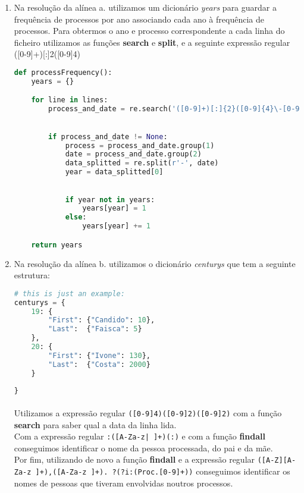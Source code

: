 \documentclass[11pt,a4paper]{report}
\begin{document}
    \begin{enumerate}[label=\alph*.]
        \item Na resolução da alínea a. utilizamos um dicionário \textit{years} para guardar a frequência de processos por ano associando cada ano à frequência de processos. Para obtermos o ano e processo correspondente a cada linha do ficheiro utilizamos as funções \textbf{search} e \textbf{split}, e a seguinte expressão regular ([0-9]+)[:]{2}([0-9]{4}) \\
        \begin{lstlisting}[language=Python, caption=Alínea a]
def processFrequency():
    years = {}

    for line in lines:
        process_and_date = re.search('([0-9]+)[:]{2}([0-9]{4}\-[0-9]{2}\-[0-9]{2})', line)
    

        if process_and_date != None:
            process = process_and_date.group(1)
            date = process_and_date.group(2)
            data_splitted = re.split(r'-', date)
            year = data_splitted[0]

        
            if year not in years:
                years[year] = 1
            else:
                years[year] += 1

    return years
        \end{lstlisting}

        \item Na resolução da alínea b. utilizamos o dicionário \textit{centurys} que tem a seguinte estrutura:
        \begin{lstlisting}[language=Python]
# this is just an example:
centurys = {
    19: {
        "First": {"Candido": 10},
        "Last":  {"Faisca": 5}
    },
    20: {
        "First": {"Ivone": 130},
        "Last":  {"Costa": 2000}
    }
    
}
        \end{lstlisting}

        \paragraph{}
        Utilizamos a expressão regular \texttt{([0-9]{4})\-([0-9]{2})\-([0-9]{2})} com a função \textbf{search} para saber qual a data da linha lida.\\ Com a expressão regular \texttt{:([A-Za-z| ]+)(:)} e com a função \textbf{findall} conseguimos identificar o nome da pessoa processada, do pai e da mãe.\\Por fim, utilizando de novo a função \textbf{findall} e a expressão regular \texttt{([A-Z][A-Za-z ]+),([A-Za-z ]+). ?(?i:(Proc.[0-9]+))} conseguimos  identificar os nomes de pessoas que tiveram envolvidas noutros processos.


\end{enumerate}
\end{document}

